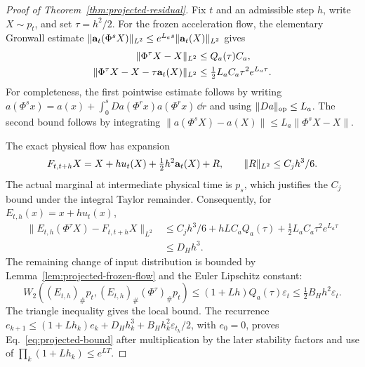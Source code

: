 \begin{proof}[Proof of Theorem~\ref{thm:projected-residual}]
Fix $t$ and an admissible step $h$, write $X\sim p_t$, and set
$\tau=h^2/2$.  For the frozen acceleration flow, the elementary
Gronwall estimate
$\|\mathbf a_t(\Phi^sX)\|_{L^2}\le e^{L_as}\|\mathbf a_t(X)\|_{L^2}$ gives
\begin{align*}
 \|\Phi^\tau X-X\|_{L^2}&\le Q_a(\tau)C_a,\\
 \|\Phi^\tau X-X-\tau\mathbf a_t(X)\|_{L^2}
   &\le \tfrac12L_aC_a\tau^2e^{L_a\tau}.
\end{align*}
For completeness, the first pointwise estimate follows by writing
$a(\Phi^s x)=a(x)+\int_0^sDa(\Phi^r x)a(\Phi^r x)\,\dd r$ and
using $\|Da\|_{\rm op}\le L_a$.  The second bound follows by
integrating $\|a(\Phi^sX)-a(X)\|\le L_a\|\Phi^sX-X\|$.

The exact physical flow has expansion
\[
 F_{t,t+h}X=X+hu_t(X)+\tfrac12h^2\mathbf a_t(X)+R,
 \qquad \|R\|_{L^2}\le C_jh^3/6.
\]
The actual marginal at intermediate physical time is $p_s$, which
justifies the $C_j$ bound under the integral Taylor remainder.
Consequently, for $E_{t,h}(x)=x+hu_t(x)$,
\begin{align*}
 \|E_{t,h}(\Phi^\tau X)-F_{t,t+h}X\|_{L^2}
 &\le C_jh^3/6+hLC_aQ_a(\tau)
       +\tfrac12L_aC_a\tau^2e^{L_a\tau}\\
 &\le D_Hh^3.
\end{align*}
The remaining change of input distribution is bounded by
Lemma~\ref{lem:projected-frozen-flow} and the Euler Lipschitz constant:
\[
 W_2((E_{t,h})_\#p_t,
       (E_{t,h})_\#(\Phi^\tau)_\#p_t)
 \le(1+Lh)Q_a(\tau)\varepsilon_t
 \le\tfrac12B_Hh^2\varepsilon_t.
\]
The triangle inequality gives the local bound.  The recurrence
$e_{k+1}\le(1+Lh_k)e_k+D_Hh_k^3+B_Hh_k^2\varepsilon_{t_k}/2$,
with $e_0=0$, proves Eq.~\eqref{eq:projected-bound} after multiplication
by the later stability factors and use of
$\prod_k(1+Lh_k)\le e^{LT}$.
\end{proof}

